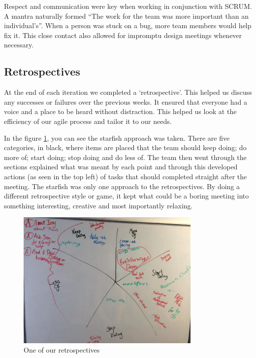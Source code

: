Respect and communication were key when working in conjunction with SCRUM. A mantra naturally formed ``The work for the team was more important than an individual's''. When a person was stuck on a bug, more team members would help fix it. This close contact also allowed for impromptu design meetings whenever necessary. 

\subsection{Retrospectives}
At the end of each iteration we completed a `retrospective'. This helped us discuss any successes or failures over the previous weeks. It ensured that everyone had a voice and a place to be heard without distraction. This helped us look at the efficiency of our agile process and tailor it to our needs.

In the figure \ref{fig:retro}, you can see the starfish approach was taken. There are five categories, in black, where items are placed that the team should keep doing; do more of; start doing; stop doing and do less of. The team then went through the sections explained what was meant by each point and through this developed actions (as seen in the top left) of tasks that should completed straight after the meeting. The starfish was only one approach to the retrospectives. By doing a different retrospective style or game, it kept what could be a boring meeting into something interesting, creative and most importantly relaxing. 

\begin{figure}[H]
    \centering
    \includegraphics[width=0.8\textwidth]{figs/3/retro}
    \caption{One of our retrospectives}
    \label{fig:retro}
\end{figure}










